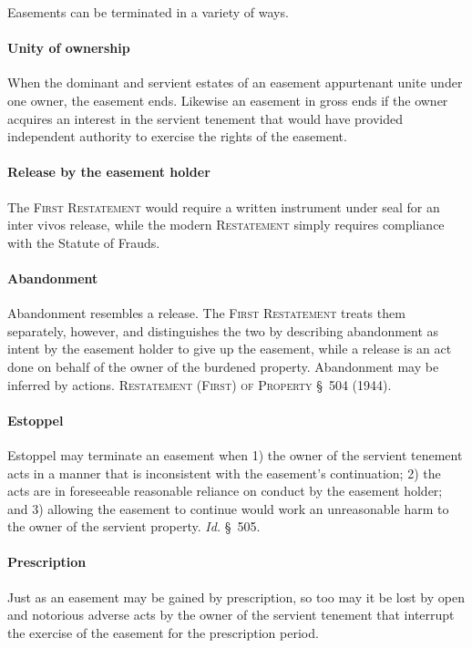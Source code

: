 Easements can be terminated in a variety of ways.

\paragraph{Unity of ownership} When the dominant and servient estates of an
easement appurtenant unite under one owner, the easement ends. Likewise an
easement in gross ends if the owner acquires an interest in the servient
tenement that would have provided independent authority to exercise the rights
of the easement.


\paragraph{Release by the easement holder} The \textsc{First Restatement}
would require a written instrument under seal for an inter vivos release, while
the modern \textsc{Restatement} simply requires compliance with the Statute of
Frauds.


\paragraph{Abandonment} Abandonment resembles a release. The \textsc{First
Restatement} treats them separately, however, and distinguishes the two by
describing abandonment as intent by the easement holder to give up the easement,
while a release is an act done on behalf of the owner of the burdened property.
Abandonment may be inferred by actions. \textsc{Restatement (First) of Property}
\S~504 (1944).


\paragraph{Estoppel} Estoppel may terminate an easement when 1) the owner of
the servient tenement acts in a manner that is inconsistent with the easement's
continuation; 2) the acts are in foreseeable reasonable reliance on conduct by
the easement holder; and 3) allowing the easement to continue would work an
unreasonable harm to the owner of the servient property. \textit{Id.} \S~505.


\paragraph{Prescription} Just as an easement may be gained by prescription,
so too may it be lost by open and notorious adverse acts by the owner of the
servient tenement that interrupt the exercise of the easement for the
prescription period.


